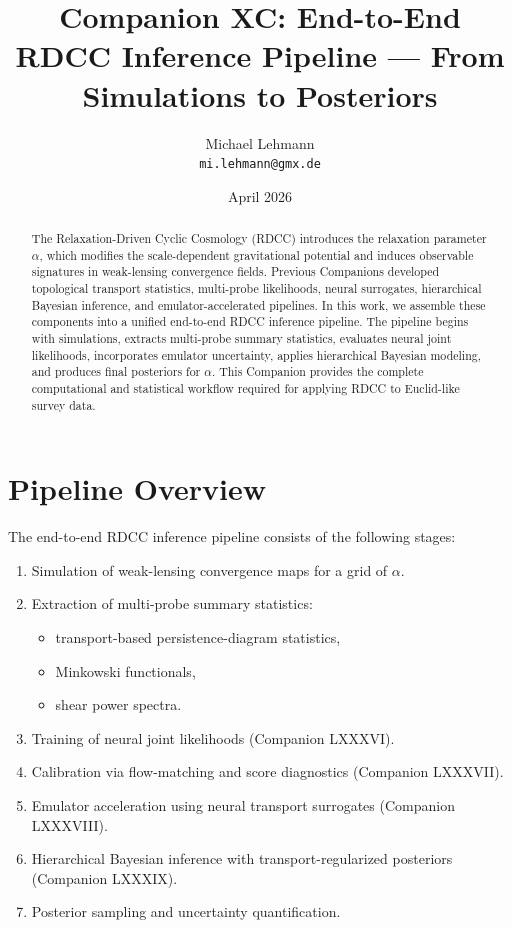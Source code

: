\documentclass[11pt,a4paper]{article}
\title{\textbf{Companion XC: End-to-End RDCC Inference Pipeline — From Simulations to Posteriors}}
\author{Michael Lehmann \\ \texttt{mi.lehmann@gmx.de}}
\date{April 2026}
\begin{document}
\maketitle

\begin{abstract}
The Relaxation-Driven Cyclic Cosmology (RDCC) introduces the relaxation parameter 
$\alpha$, which modifies the scale-dependent gravitational potential and induces 
observable signatures in weak-lensing convergence fields. Previous Companions 
developed topological transport statistics, multi-probe likelihoods, neural 
surrogates, hierarchical Bayesian inference, and emulator-accelerated pipelines. 
In this work, we assemble these components into a unified end-to-end RDCC 
inference pipeline. The pipeline begins with simulations, extracts multi-probe 
summary statistics, evaluates neural joint likelihoods, incorporates emulator 
uncertainty, applies hierarchical Bayesian modeling, and produces final 
posteriors for $\alpha$. This Companion provides the complete computational and 
statistical workflow required for applying RDCC to Euclid-like survey data.
\end{abstract}
\section{Pipeline Overview}

The end-to-end RDCC inference pipeline consists of the following stages:

\begin{enumerate}
    \item Simulation of weak-lensing convergence maps for a grid of $\alpha$.
    \item Extraction of multi-probe summary statistics:
    \begin{itemize}
        \item transport-based persistence-diagram statistics,
        \item Minkowski functionals,
        \item shear power spectra.
    \end{itemize}
    \item Training of neural joint likelihoods (Companion LXXXVI).
    \item Calibration via flow-matching and score diagnostics (Companion LXXXVII).
    \item Emulator acceleration using neural transport surrogates (Companion LXXXVIII).
    \item Hierarchical Bayesian inference with transport-regularized posteriors 
          (Companion LXXXIX).
    \item Posterior sampling and uncertainty quantification.
\end{enumerate}
\end{document}
